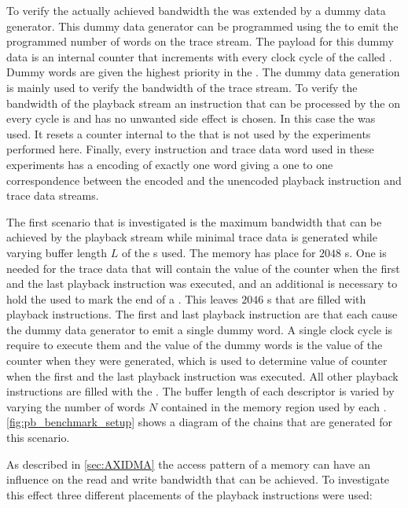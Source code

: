 To verify the actually achieved bandwidth the \pbexec{} was extended by a dummy data generator. This dummy data generator can be programmed using the \emitDummyInstr{} to emit the programmed number of words on the trace stream. The payload for this dummy data is  an \FPGA{} internal counter that increments with every clock cycle of the \pbexec{} called \systime{}. Dummy words are given the highest priority in the \traceArb{}.
The dummy data generation is mainly used to verify the bandwidth of the trace stream. To verify the bandwidth of the playback stream an instruction that can be processed by the \pbexec{} on every cycle is and has no unwanted side effect is chosen. In this case the \resetSleepInstr{} was used. It resets a counter internal to the \pbexec{} that is not used by the experiments performed here. Finally, every instruction and trace data word used in these experiments has a \UT{} encoding of exactly one \PhyWordSize{} word giving a one to one correspondence between the encoded and the unencoded playback instruction and trace data streams.

The first scenario that is investigated is the maximum bandwidth that can be achieved by the playback stream while minimal trace data is generated while varying buffer length $L$ of the \descriptor{}s used. The \descriptor{} memory has place for $\num{2048}$ \descriptor{}s. One \descriptor{} is needed for the trace data that will contain the value of the \systime{} counter when the first and the last playback instruction was executed, and an additional \descriptor{} is necessary to hold the \haltInstr{} used to mark the end of a \PlaybackProgram{}. This leaves $\num{2046}$ \descriptor{}s that are filled with playback instructions. The first and last playback instruction are \emitDummyInstr{} that each cause the dummy data generator to emit a single dummy word. A single clock cycle is require to execute them and the value of the dummy words is the value of the \systime{} counter when they were generated, which is used to determine value of \systime{} counter when the first and the last playback instruction was executed. All other playback instructions are filled with the \resetSleepInstr{}. The buffer length of each descriptor is varied by varying the number of words $N$ contained in the memory region used by each \descriptor{}. \autoref{fig:pb_benchmark_setup} shows a diagram of the \descriptor{} chains that are generated for this scenario.

As described in \autoref{sec:AXIDMA} the access pattern of a \DDR{} memory can have an influence on the read and write bandwidth that can be achieved. To investigate this effect three different placements of the playback instructions were used:

